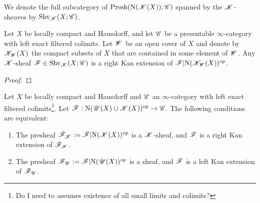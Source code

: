 \documentclass[../../thesis.tex]{subfiles}
\begin{document}
\begin{definition}
    We denote the full subcategory of $\mathrm{Presh}(\mathrm{N}(\mathscr{K}(X)); \mathscr{C})$ spanned by the $\mathscr{K}$-sheaves by $\mathrm{Shv}_{\mathscr{K}}(X;\mathscr{C})$.
\end{definition}
\begin{lemma}\label{7.3.4.8}
    Let $X$ be locally compact and Hausdorff, and let $\mathscr{C}$ be a presentable $\infty$-category with left exact filtered colimits.
    Let $\mathscr{W}$ be an open cover of $X$ and denote by $\mathscr{K}_{\mathscr{W}}(X)$ the compact subsets of $X$ that are contained in some element of $\mathscr{W}$.
    Any $\mathscr{K}$-sheaf $\mathscr{F}\in \mathrm{Shv}_{\mathscr{K}}(X;\mathscr{C})$ is a right Kan extension of $\mathscr{F}|\mathrm{N}(\mathscr{K}_{\mathscr{W}}(X))^{op}$.
\end{lemma}
\begin{proof}
\end{proof}
\begin{theorem}\label{7.3.4.9}
    Let $X$ be locally compact and Hausdorff and $\mathscr{C}$ an $\infty$-category with left exact filtered colimits\footnote{Do I need to assumes existence of all small limits and colimits?}.
    Let $\mathscr{F} : \mathrm{N}(\mathscr{U}(X) \cup \mathscr{K}(X))^{op} \to \mathscr{C}$.
    The following conditions are equivalent:
    \begin{enumerate}[]
        \item The presheaf $\mathscr{F}_{\mathscr{K}}:= \mathscr{F}|\mathrm{N}(\mathscr{K}(X))^{op}$ is a $\mathscr{K}$-sheaf, and $\mathscr{F}$ is a right Kan extension of $\mathscr{F}_{\mathscr{K}}$.
        \item The presheaf $\mathscr{F}_{\mathscr{U}}:=\mathscr{F}|\mathrm{N}(\mathscr{U}(X))^{op}$ is a sheaf, and $\mathscr{F}$ is a left Kan extension of $\mathscr{F}_{\mathscr{U}}$.
    \end{enumerate}
\end{theorem}
\end{document}
